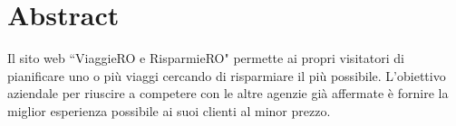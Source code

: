 \documentclass[main.tex]{subfiles}
\begin{document}
\section{Abstract}
Il sito web ``ViaggieRO e RisparmieRO" permette ai propri visitatori di pianificare uno o più viaggi cercando di risparmiare il più possibile.
L’obiettivo aziendale per riuscire a competere con le altre agenzie già affermate è fornire la miglior esperienza possibile ai suoi clienti al minor prezzo.
\end{document}
